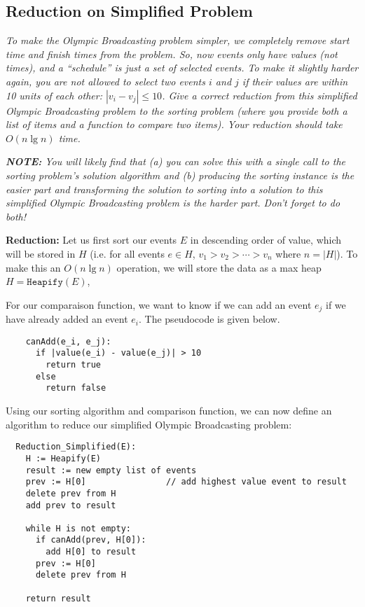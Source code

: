 \documentclass[11pt, oneside]{article}   	%
\theoremstyle{definition}
\theoremstyle{remark}
\begin{document}
\subsection{Reduction on Simplified Problem}
\textit{To make the Olympic Broadcasting problem simpler, we completely remove start time and finish times from the problem. So, now events only have values (not times), and a ``schedule'' is just a set of selected events. To make it slightly harder again, you are not allowed to select two events $i$ and $j$ if their values are within 10 units of each other: $|v_i - v_j| \leq 10$. Give a correct reduction from this simplified Olympic Broadcasting problem to the sorting problem (where you provide both a list of items and a function to compare two items). Your reduction should take $O(n \lg n)$ time.}

\textit{\textbf{NOTE:} You will likely find that (a) you can solve this with a single call to the sorting problem's solution algorithm and (b) producing the sorting instance is the easier part and transforming the solution to sorting into a solution to this simplified Olympic Broadcasting problem is the harder part. Don't forget to do both!}

\textbf{Reduction:} Let us first sort our events $E$ in descending order of value, which will be stored in $H$ (i.e. for all events $e \in H$,  $v_1 > v_2 > \dotsm> v_n$ where $n =|H|$). To make this an $O(n \lg n)$ operation, we will store the data as a max heap $H = \texttt{Heapify}(E)$,

For our comparaison function, we want to know if we can add an event $e_j$ if we have already added an event $e_i$. The pseudocode is given below.
\begin{verbatim}
	canAdd(e_i, e_j):
	  if |value(e_i) - value(e_j)| > 10
	    return true
	  else
	    return false	
\end{verbatim} 

Using our sorting algorithm and comparison function, we can now define an algorithm to reduce our simplified Olympic Broadcasting problem:
\begin{verbatim}
  Reduction_Simplified(E):
    H := Heapify(E)    
    result := new empty list of events
    prev := H[0]	            // add highest value event to result
    delete prev from H
    add prev to result
    
    while H is not empty:
      if canAdd(prev, H[0]):
        add H[0] to result
      prev := H[0]
      delete prev from H
      
    return result 
\end{verbatim}
\end{document}
